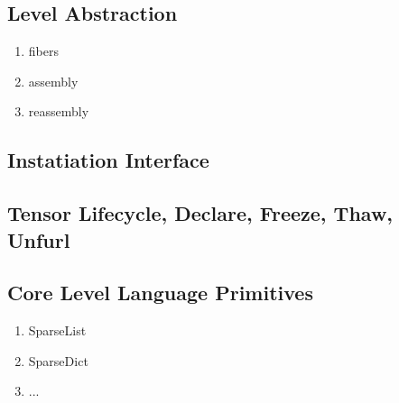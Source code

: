 
\subsection{Level Abstraction}
    
\begin{enumerate}
\item fibers
\item assembly
\item reassembly
\end{enumerate}

\subsection{Instatiation Interface}

\subsection{Tensor Lifecycle, Declare, Freeze, Thaw, Unfurl}


\subsection{Core Level Language Primitives}
\begin{enumerate}
\item SparseList
\item SparseDict
\item ...
\end{enumerate}
